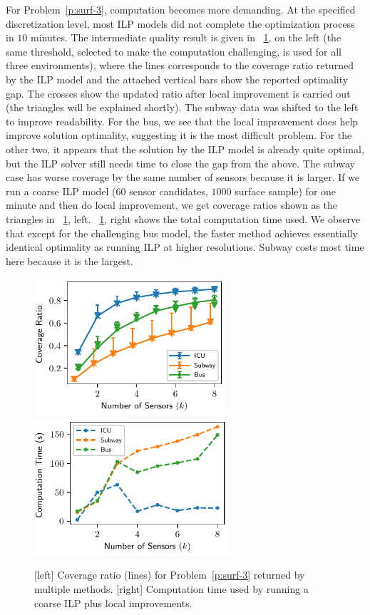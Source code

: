 For Problem~\ref{p:surf-3}, computation becomes more demanding. At the specified 
discretization level, most ILP models did not complete the optimization process 
in $10$ minutes. The intermediate quality result is given in ~\ref{fig:surf-computation-time-3}, on the left (the same threshold, selected to make the computation challenging, is used for all three environments), where the lines 
corresponds to the coverage ratio returned by the ILP model and the attached vertical bars show the reported optimality gap. The crosses show the updated ratio after local improvement is carried out (the triangles will be explained shortly). 
The subway data was shifted to the left to improve readability.
For the bus, we see that the local improvement does help improve solution optimality, suggesting it is the most difficult problem. For the other two, it appears that the solution by the ILP model is already quite optimal, but the ILP solver still needs time to close the gap from the above. The subway case has worse coverage by the same number of sensors because it is larger. If we run a coarse ILP model ($60$ sensor candidates, $1000$ surface sample) for one minute and then do local improvement, we get coverage ratios shown as the triangles in ~\ref{fig:surf-computation-time-3}, left. ~\ref{fig:surf-computation-time-3}, right shows the total computation time used. We observe that except for the challenging bus model, the faster method achieves essentially identical optimality as running ILP at higher resolutions. Subway costs most time here because it is the largest. 

\begin{figure}[!ht]
    \centering
    \includegraphics[width=.48\columnwidth, height=2in]{chapters/surf/fig/result-coverage-ratio-3-eps-converted-to.pdf}
    \includegraphics[width=.48\columnwidth, height=2in]{chapters/surf/fig/result-time-3-coarse-eps-converted-to.pdf}
    \caption{[left] Coverage ratio (lines) for Problem~\ref{p:surf-3} returned by multiple methods. [right] Computation time used by running a coarse ILP plus local improvements.}
    \label{fig:surf-computation-time-3}
\end{figure}


